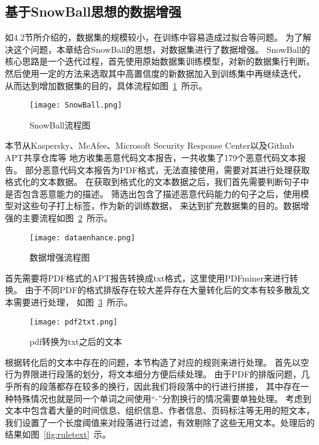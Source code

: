 \subsection{基于SnowBall思想的数据增强}
如4.2节所介绍的，数据集的规模较小，在训练中容易造成过拟合等问题。
为了解决这个问题，本章结合SnowBall的思想，对数据集进行了数据增强。
SnowBall的核心思路是一个迭代过程，首先使用原始数据集训练模型，对新的数据集行判断。
然后使用一定的方法来选取其中高置信度的新数据加入到训练集中再继续迭代，
从而达到增加数据集的目的，具体流程如图~\ref{fig:snowball}~所示。


\begin{figure}[htb]
	\centering
	\texttt{[image: SnowBall.png]}
	\caption{SnowBall流程图}
	\label{fig:snowball}
\end{figure}

本节从Kaspersky、McAfee、Microsoft Security Response Center以及Github APT共享仓库等
地方收集恶意代码文本报告，一共收集了179个恶意代码文本报告。
部分恶意代码文本报告为PDF格式，无法直接使用，需要对其进行处理获取格式化的文本数据。
在获取到格式化的文本数据之后，我们首先需要判断句子中是否包含恶意能力的描述。
筛选出包含了描述恶意代码能力的句子之后，使用模型对这些句子打上标签，作为新的训练数据，
来达到扩充数据集的目的。数据增强的主要流程如图~\ref{fig:dataenhance}~所示。
\begin{figure}[htb]
	\centering
	\texttt{[image: dataenhance.png]}
	\caption{数据增强流程图}
	\label{fig:dataenhance}
\end{figure}

首先需要将PDF格式的APT报告转换成txt格式，这里使用PDFminer来进行转换。
由于不同PDF的格式排版存在较大差异存在大量转化后的文本有较多散乱文本需要进行处理，
如图~\ref{fig:pdf2txt}~所示。

\begin{figure}[htb]
	\centering
	\texttt{[image: pdf2txt.png]}
	\caption{pdf转换为txt之后的文本}
	\label{fig:pdf2txt}
\end{figure}

根据转化后的文本中存在的问题，本节构造了对应的规则来进行处理。
首先以空行为界限进行段落的划分，将文本细分方便后续处理。
由于PDF的排版问题，几乎所有的段落都存在较多的换行，因此我们将段落中的行进行拼接，
其中存在一种特殊情况也就是同一个单词之间使用“-”分割换行的情况需要单独处理。
考虑到文本中包含着大量的时间信息、组织信息、作者信息、页码标注等无用的短文本，
我们设置了一个长度阈值来对段落进行过滤，有效剔除了这些无用文本。处理后的结果如图~\ref{fig:ruletext}~示。


